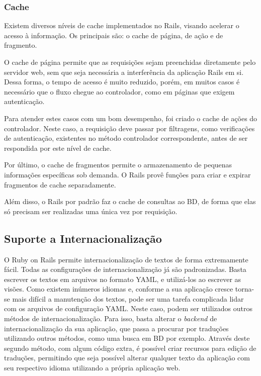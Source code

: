 \subsubsection{Cache}

Existem diversos níveis de cache implementados no Rails, visando acelerar o acesso à informação. Os principais são: o cache de página, de ação e de fragmento.

O cache de página permite que as requisições sejam preenchidas diretamente pelo servidor web, sem que seja necessária a interferência da aplicação Rails em si. Dessa forma, o tempo de acesso é muito reduzido, porém, em muitos casos é necessário que o fluxo chegue ao controlador, como em páginas que exigem autenticação.

Para atender estes casos com um bom desempenho, foi criado o cache de ações do controlador. Neste caso, a requisição deve passar por filtragens, como verificações de autenticação, existentes no método controlador correspondente, antes de ser respondida por este nível de cache.

Por último, o cache de fragmentos permite o armazenamento de pequenas informações específicas sob demanda. O Rails provê funções para criar e expirar fragmentos de cache separadamente.

Além disso, o Rails por padrão faz o cache de consultas ao BD, de forma que elas só precisam ser realizadas uma única vez por requisição.

\subsection{Suporte a Internacionalização}

O Ruby on Rails permite internacionalização de textos de forma extremamente fácil. Todas as configurações de internacionalização já são padronizadas. Basta escrever os textos em arquivos no formato YAML, e utilizá-los ao escrever as visões. Como existem inúmeros idiomas e, conforme a sua aplicação cresce torna-se mais difícil a manutenção dos textos, pode ser uma tarefa complicada lidar com os arquivos de configuração YAML. Neste caso, podem ser utilizados outros métodos de internacionalização. Para isso, basta alterar o \textit{backend} de internacionalização da sua aplicação, que passa a procurar por traduções utilizando outros métodos, como uma busca em BD por exemplo. Através deste segundo método, com algum código extra, é possível criar recursos para edição de traduções, permitindo que seja possível alterar qualquer texto da aplicação com seu respectivo idioma utilizando a própria aplicação web.

